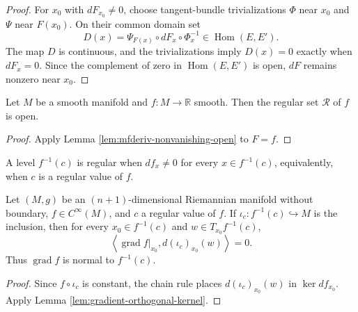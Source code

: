 \begin{proof}
\leanok
\sketch For $x_0$ with $dF_{x_0}\ne0$, choose tangent-bundle trivializations $\Phi$
near $x_0$ and $\Psi$ near $F(x_0)$. On their common domain set
\[
D(x)=\Psi_{F(x)}\circ dF_x\circ\Phi_x^{-1}\in\operatorname{Hom}(E,E').
\]
The map $D$ is continuous, and the trivializations imply $D(x)=0$ exactly when
$dF_x=0$. Since the complement of zero in $\operatorname{Hom}(E,E')$ is open,
$dF$ remains nonzero near $x_0$.
\end{proof}

\begin{lemma}
\label{lem:regular-set-open}
\leanok
{}
Let $M$ be a smooth manifold and $f\colon M\to\mathbb R$ smooth. Then the regular
set $\mathcal R$ of $f$ is open.
\end{lemma}

\begin{proof}
\leanok
{}
\sketch Apply Lemma \ref{lem:mfderiv-nonvanishing-open} to $F=f$.
\end{proof}

A level $f^{-1}(c)$ is regular when $df_x\ne0$ for every $x\in f^{-1}(c)$,
equivalently, when $c$ is a regular value of $f$.

\begin{proposition}
\label{prop:gradient-normal-regular-level-set}
\leanok
{}
Let $(M,g)$ be an $(n+1)$-dimensional Riemannian manifold without boundary,
$f\in C^\infty(M)$, and $c$ a regular value of $f$. If
$\iota_c\colon f^{-1}(c)\hookrightarrow M$ is the inclusion, then for every
$x_0\in f^{-1}(c)$ and $w\in T_{x_0}f^{-1}(c)$,
\[
\left\langle\operatorname{grad}f|_{x_0},d(\iota_c)_{x_0}(w)\right\rangle=0.
\]
Thus $\operatorname{grad}f$ is normal to $f^{-1}(c)$.
\end{proposition}

\begin{proof}
\leanok
{}
\sketch Since $f\circ\iota_c$ is constant, the chain rule places
$d(\iota_c)_{x_0}(w)$ in $\ker df_{x_0}$. Apply
Lemma \ref{lem:gradient-orthogonal-kernel}.
\end{proof}

